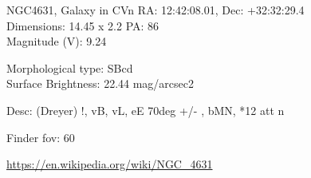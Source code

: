 \begin{block}{NGC4631, Galaxy in CVn}
    RA: 12:42:08.01, Dec: +32:32:29.4 \\ 
    Dimensions: 14.45 x 2.2 PA: 86 \\ 
    Magnitude (V): 9.24

    Morphological type: SBcd \\ 
    Surface Brightness: 22.44 mag/arcsec2 

    Desc: (Dreyer) !, vB, vL, eE 70deg +/- , bMN, *12 att n 

    Finder fov: 60 

    \url{https://en.wikipedia.org/wiki/NGC_4631} 
\end{block}